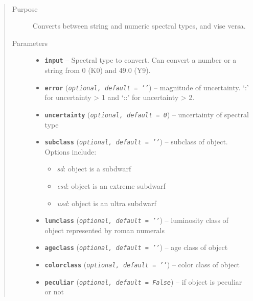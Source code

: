 \documentclass[letterpaper,10pt,english]{sphinxmanual}
\begin{document}
\begin{fulllineitems}
\label{api:splat.typeToNum}~\begin{quote}\begin{description}
\item[{Purpose}] \leavevmode
Converts between string and numeric spectral types, and vise versa.

\item[{Parameters}] \leavevmode\begin{itemize}
\item {} 
\textbf{\texttt{input}} -- Spectral type to convert. Can convert a number or a string from 0 (K0) and 49.0 (Y9).

\item {} 
\textbf{\texttt{error}} (\emph{\texttt{optional, default = '{'}}}) -- magnitude of uncertainty. `:' for uncertainty \textgreater{} 1 and `::' for uncertainty \textgreater{} 2.

\item {} 
\textbf{\texttt{uncertainty}} (\emph{\texttt{optional, default = 0}}) -- uncertainty of spectral type

\item {} 
\textbf{\texttt{subclass}} (\emph{\texttt{optional, default = '{'}}}) -- 
subclass of object. Options include:
\begin{itemize}
\item {} 
\emph{sd}: object is a subdwarf

\item {} 
\emph{esd}: object is an extreme subdwarf

\item {} 
\emph{usd}: object is an ultra subdwarf

\end{itemize}


\item {} 
\textbf{\texttt{lumclass}} (\emph{\texttt{optional, default = '{'}}}) -- luminosity class of object represented by roman numerals

\item {} 
\textbf{\texttt{ageclass}} (\emph{\texttt{optional, default = '{'}}}) -- age class of object

\item {} 
\textbf{\texttt{colorclass}} (\emph{\texttt{optional, default = '{'}}}) -- color class of object

\item {} 
\textbf{\texttt{peculiar}} (\emph{\texttt{optional, default = False}}) -- if object is peculiar or not


\end{itemize}
\end{description}
\end{quote}
\end{fulllineitems}
\end{document}
